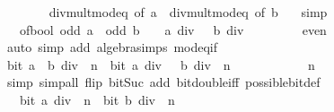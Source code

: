 \begin{isabellebody}
\ \ \ \ \ \ \isamarkupfalse%
\ div{\isacharunderscore}{\kern0pt}mult{\isacharunderscore}{\kern0pt}mod{\isacharunderscore}{\kern0pt}eq\ {\isacharbrackleft}{\kern0pt}of\ a\ {}{\isacharbrackright}{\kern0pt}\ div{\isacharunderscore}{\kern0pt}mult{\isacharunderscore}{\kern0pt}mod{\isacharunderscore}{\kern0pt}eq\ {\isacharbrackleft}{\kern0pt}of\ b\ {}{\isacharbrackright}{\kern0pt}\ \isamarkupfalse%
\ simp\isanewline
\ \ \ \ \isamarkupfalse%
\ \isamarkupfalse%
\ {\isacartoucheopen}{\isasymdots}\ {\isacharequal}{\kern0pt}\ of{\isacharunderscore}{\kern0pt}bool\ {\isacharparenleft}{\kern0pt}odd\ a\ {\isasymor}\ odd\ b{\isacharparenright}{\kern0pt}\ {\isacharplus}{\kern0pt}\ {}\ {\isacharasterisk}{\kern0pt}\ {\isacharparenleft}{\kern0pt}a\ div\ {}\ {\isacharplus}{\kern0pt}\ b\ div\ {}{\isacharparenright}{\kern0pt}{\isacartoucheclose}\isanewline
\ \ \ \ \ \ \isamarkupfalse%
\ even\ \isamarkupfalse%
\ {\isacharparenleft}{\kern0pt}auto\ simp\ add{\isacharcolon}{\kern0pt}\ algebra{\isacharunderscore}{\kern0pt}simps\ mod{}{\isacharunderscore}{\kern0pt}eq{\isacharunderscore}{\kern0pt}if{\isacharparenright}{\kern0pt}\isanewline
\ \ \ \ \isamarkupfalse%
\ \isamarkupfalse%
\ {\isacartoucheopen}bit\ {\isacharparenleft}{\kern0pt}{\isacharparenleft}{\kern0pt}a\ {\isacharplus}{\kern0pt}\ b{\isacharparenright}{\kern0pt}\ div\ {}{\isacharparenright}{\kern0pt}\ n\ {\isasymlongleftrightarrow}\ bit\ {\isacharparenleft}{\kern0pt}a\ div\ {}\ {\isacharplus}{\kern0pt}\ b\ div\ {}{\isacharparenright}{\kern0pt}\ n{\isacartoucheclose}\isanewline
\ \ \ \ \ \ \isamarkupfalse%
\ {\isacartoucheopen}{}\ {\isacharasterisk}{\kern0pt}\ {}\ {\isacharcircum}{\kern0pt}\ n\ {\isasymnoteq}\ {}{\isacartoucheclose}\ \isamarkupfalse%
\ simp\ {\isacharparenleft}{\kern0pt}simp{\isacharunderscore}{\kern0pt}all\ flip{\isacharcolon}{\kern0pt}\ bit{\isacharunderscore}{\kern0pt}Suc\ add{\isacharcolon}{\kern0pt}\ bit{\isacharunderscore}{\kern0pt}double{\isacharunderscore}{\kern0pt}iff\ possible{\isacharunderscore}{\kern0pt}bit{\isacharunderscore}{\kern0pt}def{\isacharparenright}{\kern0pt}\isanewline
\ \ \ \ \isamarkupfalse%
\ \isamarkupfalse%
\ {\isacartoucheopen}{\isasymdots}\ {\isasymlongleftrightarrow}\ bit\ {\isacharparenleft}{\kern0pt}a\ div\ {}{\isacharparenright}{\kern0pt}\ n\ {\isasymor}\ bit\ {\isacharparenleft}{\kern0pt}b\ div\ {}{\isacharparenright}{\kern0pt}\ n{\isacartoucheclose}\isanewline

\end{isabellebody}
